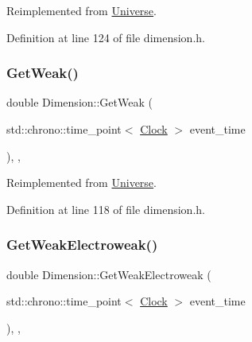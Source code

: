 Reimplemented from \mbox{\hyperlink{class_universe_af0f4b81950061e63c2855eb40957a5b1}{Universe}}.



Definition at line 124 of file dimension.\+h.

\mbox{\label{class_dimension_a656ce92d07ea600cc0ec53865ad515e2}} 
\subsubsection{\texorpdfstring{Get\+Weak()}{GetWeak()}}
{\footnotesize\ttfamily double Dimension\+::\+Get\+Weak (\begin{DoxyParamCaption}\item[{std\+::chrono\+::time\+\_\+point$<$ \mbox{\hyperlink{universe_8h_a0ef8d951d1ca5ab3cfaf7ab4c7a6fd80}{Clock}} $>$}]{event\+\_\+time }\end{DoxyParamCaption})\hspace{0.3cm}{\ttfamily [inline]}, {\ttfamily [final]}, {\ttfamily [virtual]}}



Reimplemented from \mbox{\hyperlink{class_universe_a4476b7e0a3fc1764909f556257fd9ec7}{Universe}}.



Definition at line 118 of file dimension.\+h.

\mbox{\label{class_dimension_a5bb5a164564013a60728854cc2e5ddb3}} 
\subsubsection{\texorpdfstring{Get\+Weak\+Electroweak()}{GetWeakElectroweak()}}
{\footnotesize\ttfamily double Dimension\+::\+Get\+Weak\+Electroweak (\begin{DoxyParamCaption}\item[{std\+::chrono\+::time\+\_\+point$<$ \mbox{\hyperlink{universe_8h_a0ef8d951d1ca5ab3cfaf7ab4c7a6fd80}{Clock}} $>$}]{event\+\_\+time }\end{DoxyParamCaption})\hspace{0.3cm}{\ttfamily [inline]}, {\ttfamily [final]}, {\ttfamily [virtual]}}



